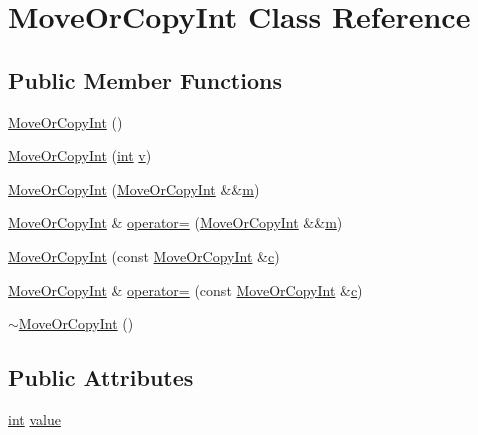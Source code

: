 \hypertarget{class_move_or_copy_int}{}\section{Move\+Or\+Copy\+Int Class Reference}
\label{class_move_or_copy_int}
\subsection*{Public Member Functions}
\begin{DoxyCompactItemize}
\item 
\mbox{\hyperlink{class_move_or_copy_int_a23b8fdc447956b59198b8e80e91f9cf8}{Move\+Or\+Copy\+Int}} ()
\item 
\mbox{\hyperlink{class_move_or_copy_int_a4c994cf3b9b5cf80d23313a4d54436f0}{Move\+Or\+Copy\+Int}} (\mbox{\hyperlink{warnings_8h_a74f207b5aa4ba51c3a2ad59b219a423b}{int}} \mbox{\hyperlink{_s_d_l__opengl_8h_a10a82eabcb59d2fcd74acee063775f90}{v}})
\item 
\mbox{\hyperlink{class_move_or_copy_int_a294d21d0ddad4cf2ff5ef2527c3921d0}{Move\+Or\+Copy\+Int}} (\mbox{\hyperlink{class_move_or_copy_int}{Move\+Or\+Copy\+Int}} \&\&\mbox{\hyperlink{_s_d_l__opengl__glext_8h_af593500c283bf1a787a6f947f503a5c2}{m}})
\item 
\mbox{\hyperlink{class_move_or_copy_int}{Move\+Or\+Copy\+Int}} \& \mbox{\hyperlink{class_move_or_copy_int_a8db9ca443ae3f162e0ec18c399372f45}{operator=}} (\mbox{\hyperlink{class_move_or_copy_int}{Move\+Or\+Copy\+Int}} \&\&\mbox{\hyperlink{_s_d_l__opengl__glext_8h_af593500c283bf1a787a6f947f503a5c2}{m}})
\item 
\mbox{\hyperlink{class_move_or_copy_int_ad7c7c79e4cb426c3facb0e47bc2836a0}{Move\+Or\+Copy\+Int}} (const \mbox{\hyperlink{class_move_or_copy_int}{Move\+Or\+Copy\+Int}} \&\mbox{\hyperlink{_s_d_l__opengl__glext_8h_a1f2d7f8147412c43ba2303a56f97ee73}{c}})
\item 
\mbox{\hyperlink{class_move_or_copy_int}{Move\+Or\+Copy\+Int}} \& \mbox{\hyperlink{class_move_or_copy_int_a532743fc49a7b2e9fb2025938c97158d}{operator=}} (const \mbox{\hyperlink{class_move_or_copy_int}{Move\+Or\+Copy\+Int}} \&\mbox{\hyperlink{_s_d_l__opengl__glext_8h_a1f2d7f8147412c43ba2303a56f97ee73}{c}})
\item 
\mbox{\hyperlink{class_move_or_copy_int_ac1337eaedf078480515182c53e4e9cae}{$\sim$\+Move\+Or\+Copy\+Int}} ()
\end{DoxyCompactItemize}
\subsection*{Public Attributes}
\begin{DoxyCompactItemize}
\item 
\mbox{\hyperlink{warnings_8h_a74f207b5aa4ba51c3a2ad59b219a423b}{int}} \mbox{\hyperlink{class_move_or_copy_int_add16874badbacfe3147cf30b577091fb}{value}}
\end{DoxyCompactItemize}


